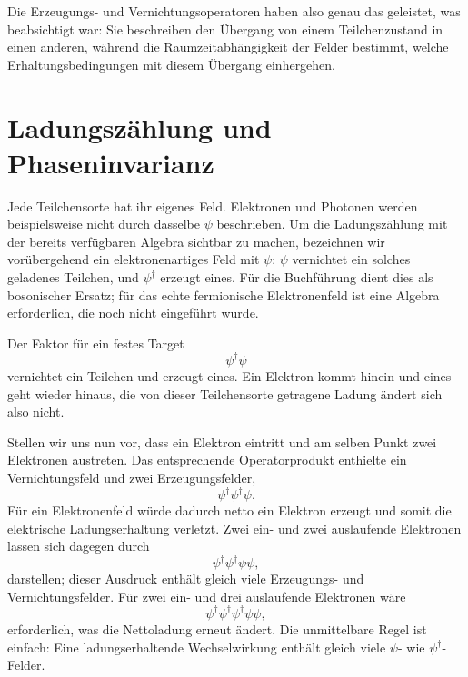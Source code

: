 Die Erzeugungs- und Vernichtungsoperatoren haben also genau das geleistet, was beabsichtigt war: Sie beschreiben den Übergang von einem Teilchenzustand in einen anderen, während die Raumzeitabhängigkeit der Felder bestimmt, welche Erhaltungsbedingungen mit diesem Übergang einhergehen.

\section{Ladungszählung und Phaseninvarianz}

Jede Teilchensorte hat ihr eigenes Feld. Elektronen und Photonen werden beispielsweise nicht durch dasselbe \(\psi\) beschrieben. Um die Ladungszählung mit der bereits verfügbaren Algebra sichtbar zu machen, bezeichnen wir vorübergehend ein elektronenartiges Feld mit \(\psi\): \(\psi\) vernichtet ein solches geladenes Teilchen, und \(\psi^\dagger\) erzeugt eines. Für die Buchführung dient dies als bosonischer Ersatz; für das echte fermionische Elektronenfeld ist eine Algebra erforderlich, die noch nicht eingeführt wurde.

Der Faktor für ein festes Target
\begin{equation}
\psi^\dagger\psi
\end{equation}
vernichtet ein Teilchen und erzeugt eines. Ein Elektron kommt hinein und eines geht wieder hinaus, die von dieser Teilchensorte getragene Ladung ändert sich also nicht.

Stellen wir uns nun vor, dass ein Elektron eintritt und am selben Punkt zwei Elektronen austreten. Das entsprechende Operatorprodukt enthielte ein Vernichtungsfeld und zwei Erzeugungsfelder,
\begin{equation}
\psi^\dagger\psi^\dagger\psi.
\end{equation}
Für ein Elektronenfeld würde dadurch netto ein Elektron erzeugt und somit die elektrische Ladungserhaltung verletzt. Zwei ein- und zwei auslaufende Elektronen lassen sich dagegen durch
\begin{equation}
\psi^\dagger\psi^\dagger\psi\psi,
\end{equation}
darstellen; dieser Ausdruck enthält gleich viele Erzeugungs- und Vernichtungsfelder. Für zwei ein- und drei auslaufende Elektronen wäre
\begin{equation}
\psi^\dagger\psi^\dagger\psi^\dagger\psi\psi,
\end{equation}
erforderlich, was die Nettoladung erneut ändert. Die unmittelbare Regel ist einfach: Eine ladungserhaltende Wechselwirkung enthält gleich viele \(\psi\)- wie \(\psi^\dagger\)-Felder.

